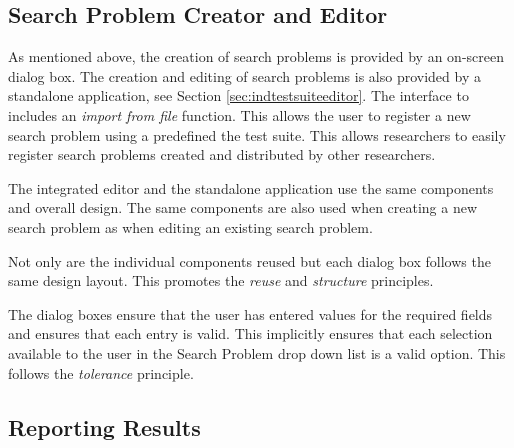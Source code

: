 \subsection{Search Problem Creator and Editor}
\label{sec:guisearchcreateed}
As mentioned above, the creation of search problems is provided by an on-screen dialog box.
The creation and editing of search problems is also provided by a standalone application, see Section \ref{sec:indtestsuiteeditor}.
The interface to includes an \emph{import from file} function.
This allows the user to register a new search problem using a predefined the test suite.
This allows researchers to easily register search problems created and distributed by other researchers.

The integrated editor and the standalone application use the same components and overall design.
The same components are also used when creating a new search problem as when editing an existing search problem.

Not only are the individual components reused but each dialog box follows the same design layout.
This promotes the \emph{reuse} and \emph{structure} principles.

The dialog boxes ensure that the user has entered values for the required fields and ensures that each entry is valid.
This implicitly ensures that each selection available to the user in the Search Problem drop down list is a valid option.
This follows the \emph{tolerance} principle.

\subsection{Reporting Results}
\label{sec:repres}

